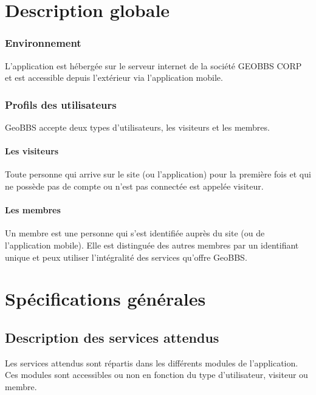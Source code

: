 \documentclass[a4paper,12pt]{report}
\begin{document}
\begin{onehalfspace}
\chapter{Description globale}

\subsection{Environnement} %
\label{sub:environnement}
L’application est hébergée sur le serveur internet de la société GEOBBS CORP et est accessible depuis l’extérieur via l'application mobile.


\subsection{Profils des utilisateurs} %
\label{sub:profils_des_utilisateurs}

GeoBBS accepte deux types d’utilisateurs, les visiteurs et les membres.

\subsubsection{Les visiteurs}
Toute personne qui arrive sur le site (ou l'application) pour la première fois et qui ne possède pas de compte ou n’est pas connectée est appelée visiteur.

\subsubsection{Les membres}
Un membre est une personne qui s’est identifiée auprès du site (ou de l'application mobile). Elle est distinguée des autres membres par un identifiant unique et peux utiliser l’intégralité des services qu’offre GeoBBS.


\chapter{Spécifications générales} %
\label{cha:sp_cifications_g_n_rales}

\section{Description des services attendus}

Les services attendus sont répartis dans les différents modules de l’application. Ces modules sont accessibles ou non en fonction du type d’utilisateur, visiteur ou membre.


\end{onehalfspace}
\end{document}
